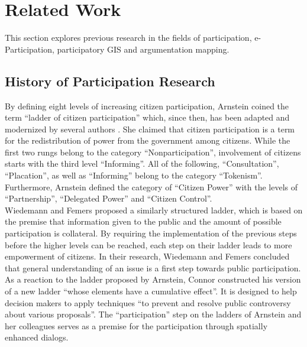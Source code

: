 \section{Related Work}
\label{chap:related_work}
This section explores previous research in the fields of participation, e-Participation, participatory GIS and argumentation mapping.%


\subsection{History of Participation Research}
By defining eight levels of increasing citizen participation, Arnstein \cite{Arnstein1969_citizen_participation} coined the term ``ladder of citizen participation'' which, since then, has been adapted and modernized by several authors \cite{Connor1988_new_ladder,carver2003future,Collins2009_social_learning,you2009_participatory_map_based,Cai2009_spatial_annotation_deliberation,Macintosh2004_eParticipation_characterization,Schlossberg2005_PPGIS}.  She claimed that citizen participation is a term for the redistribution of power from the government among citizens. While the first two rungs belong to the category ``Nonparticipation'', involvement of citizens starts with the third level ``Informing''. All of the following, ``Consultation'', ``Placation'', as well as ``Informing'' belong to the category ``Tokenism''. Furthermore, Arnstein defined the category of ``Citizen Power'' with the levels of ``Partnership'', ``Delegated Power'' and ``Citizen Control''.\\
Wiedemann and Femers \cite{Wiedemann1993355} proposed a similarly structured ladder, which is based on the premise that information given to the public and the amount of possible participation is collateral. By requiring the implementation of the previous steps before the higher levels can be reached, each step on their ladder leads to more empowerment of citizens. In their research, Wiedemann and Femers concluded that general understanding of an issue is a first step towards public participation.\\
As a reaction to the ladder proposed by Arnstein, Connor \cite{Connor1988_new_ladder} constructed his version of a new ladder ``whose elements have a cumulative effect''. It is designed to help decision makers to apply techniques ``to prevent and resolve public controversy about various proposals''. The ``participation'' step on the ladders of Arnstein and her colleagues serves as a premise for the participation through spatially enhanced dialogs.%

